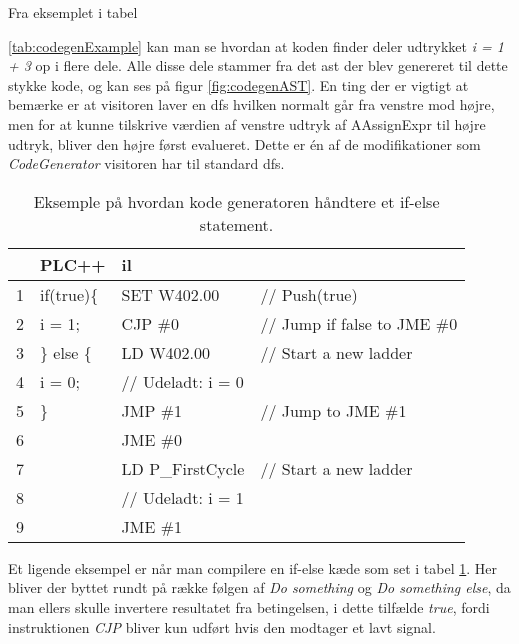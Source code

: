 \noindent Fra eksemplet i tabel {\ref{tab:codegenExample} kan man se hvordan at koden finder deler udtrykket \textit{i = 1 + 3} op i flere dele. Alle disse dele stammer fra det \gls{ast} der blev genereret til dette stykke kode, og kan ses på figur \ref{fig:codegenAST}. En ting der er vigtigt at bemærke er at visitoren laver en \gls{dfs} hvilken normalt går fra venstre mod højre, men for at kunne tilskrive værdien af venstre udtryk af AAssignExpr til højre udtryk, bliver den højre først evalueret. Dette er én af de modifikationer som \textit{CodeGenerator} visitoren har til standard \gls{dfs}.


\begin{table}[H]
    \centering\ttfamily
    \begin{tabular}{l|l|l l}
         &PLC++                 & \gls{il} \\\hline
        1&if(true)\{            & SET W402.00       &// Push(true)\\
        2&  i = 1;              & CJP \#0           &// Jump if false to JME \#0\\
        3&\} else \{            & LD W402.00        &// Start a new ladder\\
        4&  i = 0;              & // Udeladt: i = 0\\
        5& \}                   & JMP \#1           &// Jump to JME \#1\\
        6&                      & JME \#0           &\\
        7&                      & LD P\_FirstCycle  &// Start a new ladder\\
        8&                      & // Udeladt: i = 1\\
        9&                      & JME \#1
    \end{tabular}
    \caption{Eksemple på hvordan kode generatoren håndtere et if-else statement.}
    \label{tab:codegenIf}
\end{table}

\noindent Et ligende eksempel er når man compilere en if-else kæde som set i tabel \ref{tab:codegenIf}. Her bliver der byttet rundt på række følgen af \textit{Do something} og \textit{Do something else}, da man ellers skulle invertere resultatet fra betingelsen, i dette tilfælde \textit{true}, fordi instruktionen \textit{CJP} bliver kun udført hvis den modtager et lavt signal.

}
